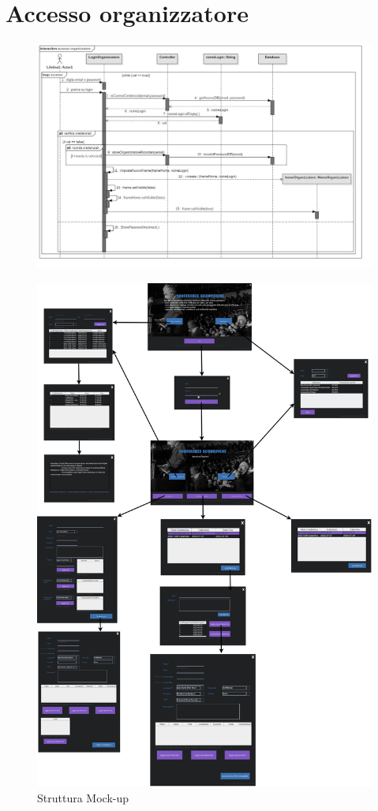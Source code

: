 \documentclass[a4paper,italian,10pt,openany]{book}
\begin{document}
\section{Accesso organizzatore}
\vspace{4cm}
\begin{figure}[h!]
\centering
\includegraphics[width=18cm]{SD2}
\end{figure}
\newpage
\vspace{.5cm}
\begin{figure}[h!]
\centering
\includegraphics[width=17cm]{mockup}
\caption{Struttura Mock-up}
\label{mockup}
\end{figure}
\end{document}
